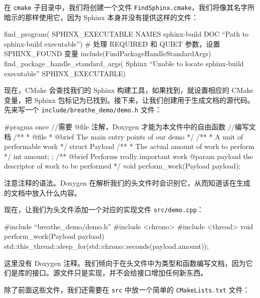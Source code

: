 在 \texttt{cmake} 子目录中，我们将创建一个文件 \texttt{Find\allowbreak{}Sphinx.\allowbreak{}cmake}，我们将像其名字所暗示的那样使用它，因为 Sphinx 本身并没有提供这样的文件：

\begin{codebox}[cmake]
find_program(
  SPHINX_EXECUTABLE
  NAMES sphinx-build
  DOC “Path to sphinx-build executable”)
# 处理 REQUIRED 和 QUIET 参数，设置 SPHINX_FOUND 变量
include(FindPackageHandleStandardArgs)
find_package_handle_standard_args(
  Sphinx “Unable to locate sphinx-build executable” SPHINX_EXECUTABLE)
\end{codebox}

\label{idx:255}
现在，CMake 会查找我们的 Sphinx 构建工具，如果找到，就设置相应的 CMake 变量，把 Sphinx 包标记为已找到。接下来，让我们创建用于生成文档的源代码。先来写一个 \texttt{include/\allowbreak{}breathe\_\allowbreak{}demo/\allowbreak{}demo.\allowbreak{}h} 文件：

\begin{codebox}[cpp]
#pragma once
//需要 @file 注解，Doxygen 才能为本文件中的自由函数
//编写文档
/**
 * @file
 * @brief The main entry points of our demo
 */
/**
 * A unit of performable work
 */
struct Payload {
  /**
   * The actual amount of work to perform
   */
  int amount;
};
/**
   @brief Performs really important work
   @param payload the descriptor of work to be performed
 */
void perform_work(Payload payload);
\end{codebox}

注意注释的语法。Doxygen 在解析我们的头文件时会识别它，从而知道该在生成的文档中放入什么内容。

现在，让我们为头文件添加一个对应的实现文件 \texttt{src/\allowbreak{}demo.\allowbreak{}cpp}：

\begin{codebox}[cpp]
#include “breathe_demo/demo.h”
#include <chrono>
#include <thread>
void perform_work(Payload payload) {
  std::this_thread::sleep_for(std::chrono::seconds(payload.amount));
}
\end{codebox}

\label{idx:256}
这里没有 Doxygen 注释。我们倾向于在头文件中为类型和函数编写文档，因为它们是库的接口。源文件只是实现，并不会给接口增加任何新东西。

除了前面这些文件，我们还需要在 \texttt{src} 中放一个简单的 \texttt{CMake\allowbreak{}Lists.\allowbreak{}txt} 文件：


